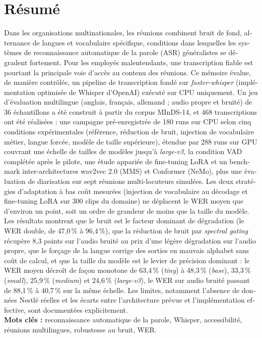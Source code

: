\documentclass[12pt]{report}
\begin{document}
\section*{Résumé}
\begin{otherlanguage}{french}
Dans les organisations multinationales, les réunions combinent bruit de fond, alternance de langues et vocabulaire spécifique, conditions dans lesquelles les systèmes de reconnaissance automatique de la parole (ASR) généralistes se dégradent fortement. Pour les employés malentendants, une transcription fiable est pourtant la principale voie d'accès au contenu des réunions. Ce mémoire évalue, de manière contrôlée, un pipeline de transcription fondé sur \textit{faster-whisper} (implémentation optimisée de Whisper d'OpenAI) exécuté sur CPU uniquement. Un jeu d'évaluation multilingue (anglais, français, allemand ; audio propre et bruité) de 36 échantillons a été construit à partir du corpus MInDS-14, et 468 transcriptions ont été réalisées : une campagne pré-enregistrée de 180 runs sur CPU selon cinq conditions expérimentales (référence, réduction de bruit, injection de vocabulaire métier, langue forcée, modèle de taille supérieure), étendue par 288 runs sur GPU couvrant une échelle de tailles de modèles jusqu'à \textit{large-v3}, la condition VAD complétée après le pilote, une étude appariée de fine-tuning LoRA et un benchmark inter-architectures wav2vec 2.0 (MMS) et Conformer (NeMo), plus une évaluation de diarisation sur sept réunions multi-locuteurs simulées. Les deux stratégies d'adaptation à bas coût mesurées (injection de vocabulaire au décodage et fine-tuning LoRA sur 300 clips du domaine) ne déplacent le WER moyen que d'environ un point, soit un ordre de grandeur de moins que la taille du modèle. Les résultats montrent que le bruit est le facteur dominant de dégradation (le WER double, de 47{,}0\,\% à 96{,}4\,\%), que la réduction de bruit par \textit{spectral gating} récupère 8{,}3 points sur l'audio bruité au prix d'une légère dégradation sur l'audio propre, que le forçage de la langue corrige des sorties en mauvais alphabet sans coût de calcul, et que la taille du modèle est le levier de précision dominant : le WER moyen décroît de façon monotone de 63{,}4\,\% (\textit{tiny}) à 48{,}3\,\% (\textit{base}), 33{,}3\,\% (\textit{small}), 25{,}9\,\% (\textit{medium}) et 24{,}6\,\% (\textit{large-v3}), le WER sur audio bruité passant de 88{,}1\,\% à 40{,}7\,\% sur la même échelle. Les limites, notamment l'absence de données Nestlé réelles et les écarts entre l'architecture prévue et l'implémentation effective, sont documentées explicitement.
\\
\textbf{Mots clés :} reconnaissance automatique de la parole, Whisper, accessibilité, réunions multilingues, robustesse au bruit, WER.
\end{otherlanguage}
\thispagestyle{fancy}
\newpage
\end{document}
